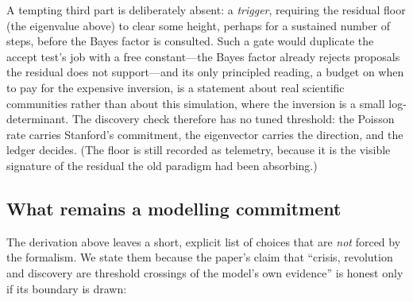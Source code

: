 A tempting third part is deliberately absent: a \emph{trigger}, requiring the residual floor
(the eigenvalue above) to clear some height, perhaps for a sustained number of steps, before
the Bayes factor is consulted. Such a gate would duplicate the accept test's job with a free
constant---the Bayes factor already rejects proposals the residual does not support---and its
only principled reading, a budget on when to pay for the expensive inversion, is a statement
about real scientific communities rather than about this simulation, where the inversion is a
small log-determinant. The discovery check therefore has no tuned threshold: the Poisson rate
carries Stanford's commitment, the eigenvector carries the direction, and the ledger decides.
(The floor is still recorded as telemetry, because it is the visible signature of the residual
the old paradigm had been absorbing.)

\subsection{What remains a modelling commitment}

The derivation above leaves a short, explicit list of choices that are \emph{not} forced by the
formalism. We state them because the paper's claim that ``crisis, revolution and discovery are
threshold crossings of the model's own evidence'' is honest only if its boundary is drawn:

